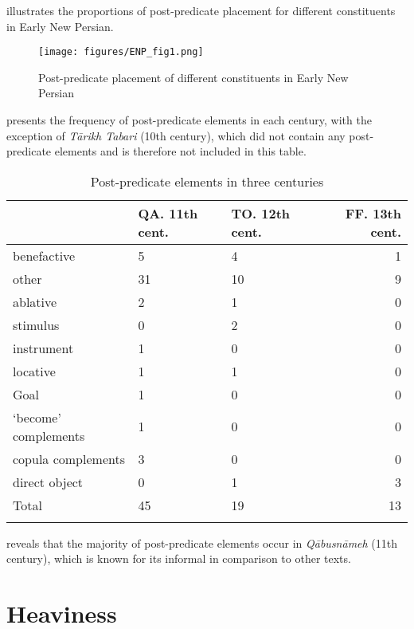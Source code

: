 \documentclass[output=paper,colorlinks,citecolor=brown,draftmode]{langscibook}
\begin{document}
 illustrates the proportions of post-predicate placement for different constituents in Early New Persian.

\begin{figure}
 \texttt{[image: figures/ENP\_fig1.png]}
 \caption{Post-predicate placement of different constituents in Early New Persian}
 \label{ENP:fig:1}
\end{figure}

 presents the frequency of post-predicate elements in each century, with the exception of \textit{Tārikh Tabari} (10th century), which did not contain any post-predicate elements and is therefore not included in this table.

\begin{table}
\begin{tabularx}{\textwidth}{lYYr}
\lsptoprule
&  {QA. 11th cent.} &  {TO. 12th cent.} &  {FF. 13th cent.} \\
 \midrule
  {benefactive} &  5 & 4 & 1 \\
 other&31 & 10 & 9 \\
  {ablative} &2 & 1 & 0 \\
  {stimulus} &0 & 2 & 0 \\
  {instrument} &1 & 0 & 0 \\
  {locative} &1 & 1 & 0 \\
  {Goal} &1 & 0 & 0 \\
  `become' complements &1 & 0 & 0 \\
   {copula} complements &3 & 0 & 0 \\
 direct  {object}& 0 & 1 & 3 \\
 \midrule
 Total & 45 & 19 & 13 \\
\lspbottomrule
 \end{tabularx}
 \caption{Post-predicate elements in three centuries}
 \label{ENP:tab:4}
\end{table}

 reveals that the majority of post-predicate elements occur in \textit{Qābusnāmeh} (11th century), which is known for its informal  in comparison to other texts.

\section{Heaviness}\label{ENP:ss:4}
\end{document}
